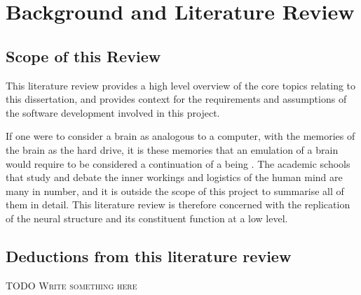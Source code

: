 \chapter{Background and Literature Review}

\section{Scope of this Review}
This literature review provides a high level overview of the core topics relating to this dissertation, and provides context for the requirements and assumptions of the software development involved in this project. 

If one were to consider a brain as analogous to a computer, with the memories of
the brain as the hard drive, it is these memories that an  emulation of a brain
would require to be considered a continuation of a being
\autocite{eichenbaum_cognitive_2011}. The academic schools that study and debate
the inner workings and logistics of the human mind are many in number, and it is
outside the scope of this project to summarise all of them in detail.  This
literature review is therefore concerned with the replication of the neural
structure and its constituent function at a low level.







\section{Deductions from this literature review}

\textsc{TODO Write something here}
